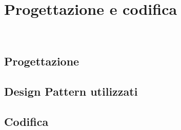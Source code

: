 \chapter{Progettazione e codifica}
\label{cap:progettazione-codifica}



\\

%
%
%
%

\section{Progettazione}
\label{sec:progettazione}

%


\section{Design Pattern utilizzati}

\section{Codifica}
